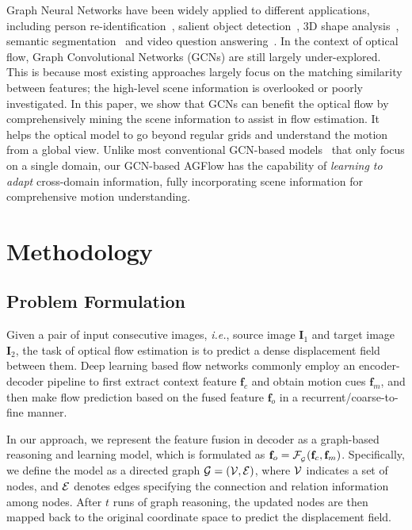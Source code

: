 \documentclass[letterpaper]{article} %
\begin{document}
Graph Neural Networks have been widely applied to different applications, including person re-identification~\cite{shen2018person}, salient object detection~\cite{luo2020cascade}, 3D shape analysis~\cite{wei2020view}, semantic segmentation~\cite{luo2021robust} and video question answering~\cite{Park_2021_CVPR}. In the context of optical flow, Graph Convolutional Networks (GCNs) are still largely under-explored. This is because most existing approaches largely focus on the matching similarity between features; the high-level scene information is overlooked or poorly investigated. In this paper, we show that GCNs can benefit the optical flow by comprehensively mining the scene information to assist in flow estimation. It helps the optical model to go beyond regular grids and understand the motion from a global view. Unlike most conventional GCN-based models~\cite{mohamed2020social,wei2020view,luo2021robust,Park_2021_CVPR} that only focus on a single domain, our GCN-based AGFlow has the capability of \emph{learning to adapt} cross-domain information, fully incorporating scene information for comprehensive motion understanding.

\section{Methodology}
\label{sec:3}

\subsection{Problem Formulation}

Given a pair of input consecutive images, {\em i.e.}, source image ${\mathbf I}_1$ and target image ${\mathbf I}_2$, the task of optical flow estimation is to predict a dense displacement field between them. Deep learning based flow networks commonly employ an encoder-decoder pipeline to first extract context feature ${\mathbf f}_c$ and obtain motion cues ${\mathbf f}_m$, and then make flow prediction based on the fused feature ${\mathbf f}_o$ in a recurrent/coarse-to-fine manner.

In our approach, we represent the feature fusion in decoder as a graph-based reasoning and learning model, which is formulated as ${\mathbf f}_o = {\cal F}_{\\_{\cal G}}({\mathbf f}_c, {\mathbf f}_m)$. Specifically, we define the model as a directed graph $\cal G = (\cal{V, E})$, where $\cal V$ indicates a set of nodes, and $\cal E$ denotes edges specifying the connection and relation information among nodes. After $t$ runs of graph reasoning, the updated nodes are then mapped back to the original coordinate space to predict the displacement field.
\end{document}
